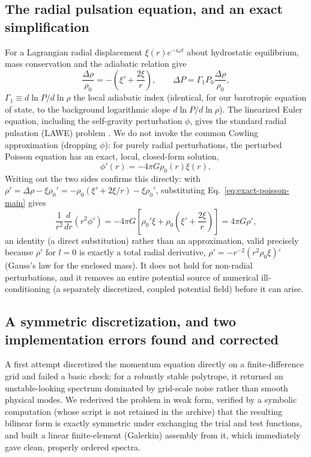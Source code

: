 \documentclass[11pt]{article}
\begin{document}
\subsection{The radial pulsation equation, and an exact simplification}

For a Lagrangian radial displacement $\xi(r)e^{-i\omega t}$ about hydrostatic equilibrium, mass conservation and the adiabatic relation give
\begin{equation}
\frac{\Delta\rho}{\rho_0}=-\left(\xi'+\frac{2\xi}{r}\right),\qquad \Delta P=\Gamma_1P_0\frac{\Delta\rho}{\rho_0},
\end{equation}
$\Gamma_1\equiv d\ln P/d\ln\rho$ the local adiabatic index (identical, for our barotropic equation of state, to the background logarithmic slope $d\ln P/d\ln\rho$). The linearized Euler equation, including the self-gravity perturbation $\phi$, gives the standard radial pulsation (LAWE) problem \citep{Pekeris1938,Cowling1941,Chandrasekhar1964}. We do not invoke the common Cowling approximation (dropping $\phi$): for purely radial perturbations, the perturbed Poisson equation has an exact, local, closed-form solution,
\begin{equation}
\phi'(r)=-4\pi G\rho_0(r)\xi(r),
\label{eq:exact-poisson-main}
\end{equation}
Writing out the two sides confirms this directly: with $\rho'=\Delta\rho-\xi\rho_0'=-\rho_0(\xi'+2\xi/r)-\xi\rho_0'$, substituting Eq.~\eqref{eq:exact-poisson-main} gives
\begin{equation}
\frac{1}{r^2}\frac{d}{dr}\!\left(r^2\phi'\right) = -4\pi G\left[\rho_0'\xi+\rho_0\!\left(\xi'+\frac{2\xi}{r}\right)\right] = 4\pi G\rho',
\end{equation}
an identity (a direct substitution) rather than an approximation, valid precisely because $\rho'$ for $l=0$ is exactly a total radial derivative, $\rho'=-r^{-2}(r^2\rho_0\xi)'$ (Gauss's law for the enclosed mass). It does not hold for non-radial perturbations, and it removes an entire potential source of numerical ill-conditioning (a separately discretized, coupled potential field) before it can arise.

\subsection{A symmetric discretization, and two implementation errors found and corrected}
\label{sec:galerkin-main}

A first attempt discretized the momentum equation directly on a finite-difference grid and failed a basic check: for a robustly stable polytrope, it returned an unstable-looking spectrum dominated by grid-scale noise rather than smooth physical modes. We rederived the problem in weak form, verified by a symbolic computation (whose script is not retained in the archive) that the resulting bilinear form is exactly symmetric under exchanging the trial and test functions, and built a linear finite-element (Galerkin) assembly from it, which immediately gave clean, properly ordered spectra.
\end{document}
